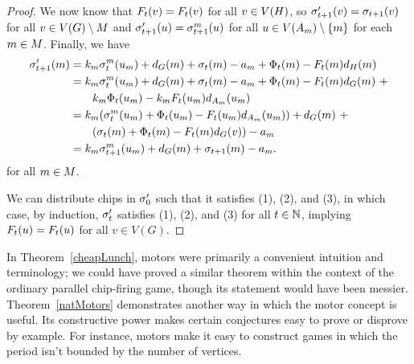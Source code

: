 \begin{proof}
We now know that $\firing[\s']{v}{t} = \firing{v}{t}$ for all $v \in \V[H]$, so
$\chips[\s']{v}{t+1} = \chips{v}{t+1}$ for all $v \in \V[G] \setminus \mots$
and $\chips[\s']{u}{t+1} = \chips[\s^m]{u}{t+1}$ for all $u \in \V[A_m]
\setminus \{m\}$ for each $m \in \mots$. Finally, we have
\begin{align*}
  \chips[\s']{m}{t+1} &= k_m\chips[\s^m]{u_m}{t} + \deg[G]{m} + \chips{m}{t} -
  a_m + \receiving[\s']{m}{t} - \firing[\s']{m}{t}\deg[H]{m} \\
  &= k_m\chips[\s^m]{u_m}{t} + \deg[G]{m} + \chips{m}{t} - a_m +
  \receiving{m}{t}
  - \firing{m}{t}\deg[G]{m}\ + \\
  &\qquad k_m\receiving[\s^m]{u_m}{t} -
  k_m\firing[\s^m]{u_m}{t}\deg[{A_m}]{u_m} \\
  &= k_m(\chips[\s^m]{u_m}{t} + \receiving[\s^m]{u_m}{t} -
  \firing[\s^m]{u_m}{t}\deg[{A_m}]{u_m}) + \deg[G]{m}\ + \\
  &\qquad (\chips{m}{t} + \receiving[\s]{m}{t} - \firing[\s]{m}{t}\deg[G]{v)} -
  a_m \\
  &= k_m\chips[\s^m]{u_m}{t+1} + \deg[G]{m} + \chips{m}{t+1} - a_m.
\end{align*}
for all $m \in \mots$.

We can distribute chips in $\pos[\s']{0}$ such that it satisfies (1), (2), and
(3), in which case, by induction, $\pos[\s']{t}$ satisfies (1), (2), and (3)
for all $t \in \nats$, implying $\firing[\s']{u}{t} = \firing{u}{t}$ for all $v
\in V(G)$.
\end{proof}

In Theorem~\ref{cheapLunch}, motors were primarily a convenient intuition and
terminology; we could have proved a similar theorem within the context of the
ordinary parallel chip-firing game, though its statement would have been
messier. Theorem~\ref{natMotors} demonstrates another way in which the motor
concept is useful. Its constructive power makes certain conjectures easy to
prove or disprove by example. For instance, motors make it easy to construct
games in which the period isn't bounded by the number of vertices.

\hidegame
